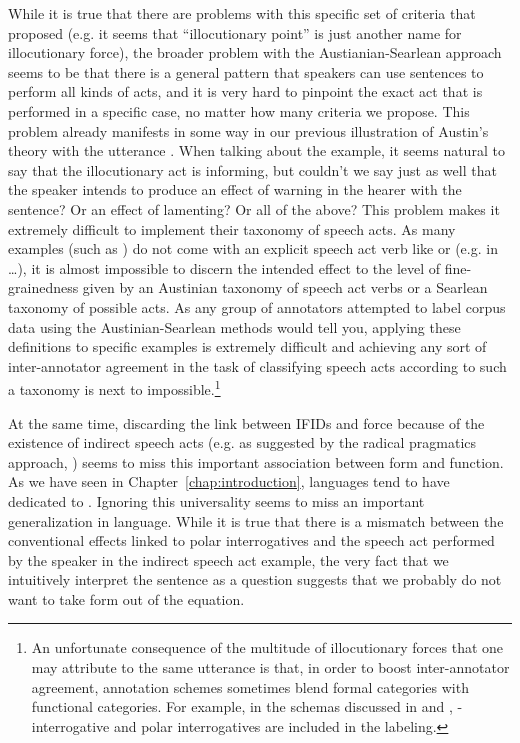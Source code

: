 While it is true that there are problems with this specific set of criteria that \textcite{searlevanderveken1985} proposed (e.g. it seems that ``illocutionary point'' is just another name for illocutionary force), the broader problem with the Austianian-Searlean approach seems to be that there is a general pattern that speakers can use sentences to perform all kinds of acts, and it is very hard to pinpoint the exact act that is performed in a specific case, no matter how many criteria we propose. This problem already manifests in some way in our previous illustration of Austin's theory with the utterance . When talking about the example, it seems natural to say that the illocutionary act is informing, but couldn’t we say just as well that the speaker intends to produce an effect of warning in the hearer with the sentence? Or an effect of lamenting? Or all of the above? This problem makes it extremely difficult to implement their taxonomy of speech acts. As many examples (such as ) do not come with an explicit speech act verb like  or  (e.g. in  \ldots), it  is almost impossible to discern the intended effect to the level of fine-grainedness given by an Austinian taxonomy of speech act verbs or a Searlean taxonomy of possible acts. As any group of annotators attempted to label corpus data using the Austinian-Searlean methods would tell you, applying these definitions to specific examples is extremely difficult and achieving any sort of inter-annotator agreement in the task of classifying speech acts according to such a taxonomy is next to impossible.\footnote{An unfortunate consequence of the multitude of illocutionary forces that one may attribute to the same utterance is that, in order to boost inter-annotator agreement, annotation schemes sometimes blend formal categories with functional categories. For example, in the schemas discussed in \textcite{ninio1994} and \textcite{dialogact}, \twh-interrogative and polar interrogatives are included in the labeling.} 

At the same time, discarding the link between IFIDs and force because of the existence of indirect speech acts (e.g. as suggested by the radical pragmatics approach, \cite{atlaslevinson1981, levinson1983}) seems to miss this important association between form and function. As we have seen in Chapter~\ref{chap:introduction}, languages tend to have \diis{} dedicated to \aqrs{}. Ignoring this universality seems to miss an important generalization in language. While it is true that there is a mismatch between the conventional effects linked to polar interrogatives and the speech act performed by the speaker in the indirect speech act  example, the very fact that we intuitively interpret the sentence as a question suggests that we probably do not want to take form out of the equation.

